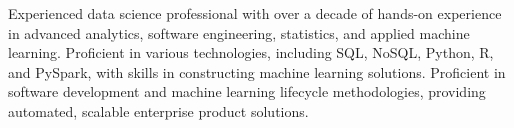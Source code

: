 
\Summary
{
Experienced data science professional with over a decade of hands-on
experience in advanced analytics, software engineering, statistics, and
applied machine learning. Proficient in various technologies, including SQL,
NoSQL, Python, R, and PySpark, with skills in constructing machine learning
solutions. Proficient in software development and machine learning lifecycle
methodologies, providing automated, scalable enterprise product solutions.
}